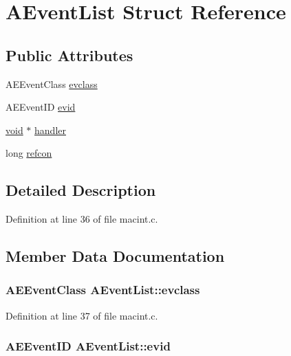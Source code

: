 \hypertarget{struct_a_event_list}{}\section{A\+Event\+List Struct Reference}
\label{struct_a_event_list}
\subsection*{Public Attributes}
\begin{DoxyCompactItemize}
\item 
A\+E\+Event\+Class \hyperlink{struct_a_event_list_a6ce6e9524c55dde5451af2b9bfc49b42}{evclass}
\item 
A\+E\+Event\+ID \hyperlink{struct_a_event_list_aaa711020218c559f0b2378ae83c3c608}{evid}
\item 
\hyperlink{sound_8c_ae35f5844602719cf66324f4de2a658b3}{void} $\ast$ \hyperlink{struct_a_event_list_a227d5e9032200367a7a54898a0ea0eed}{handler}
\item 
long \hyperlink{struct_a_event_list_ab0bffe731a66d56658a41f5e2fdbfbff}{refcon}
\end{DoxyCompactItemize}


\subsection{Detailed Description}


Definition at line 36 of file macint.\+c.



\subsection{Member Data Documentation}
\subsubsection[{\texorpdfstring{evclass}{evclass}}]{\setlength{\rightskip}{0pt plus 5cm}A\+E\+Event\+Class A\+Event\+List\+::evclass}\hypertarget{struct_a_event_list_a6ce6e9524c55dde5451af2b9bfc49b42}{}\label{struct_a_event_list_a6ce6e9524c55dde5451af2b9bfc49b42}


Definition at line 37 of file macint.\+c.

\subsubsection[{\texorpdfstring{evid}{evid}}]{\setlength{\rightskip}{0pt plus 5cm}A\+E\+Event\+ID A\+Event\+List\+::evid}\hypertarget{struct_a_event_list_aaa711020218c559f0b2378ae83c3c608}{}\label{struct_a_event_list_aaa711020218c559f0b2378ae83c3c608}


